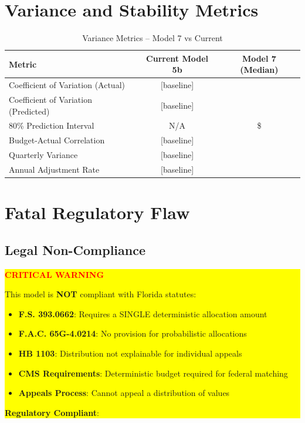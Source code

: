 \section{Variance and Stability Metrics}

\begin{table}[h]
\centering
\caption{Variance Metrics -- Model 7 vs Current}
\begin{tabular}{lcc}
\toprule
\textbf{Metric} & \textbf{Current Model 5b} & \textbf{Model 7 (Median)} \\
\midrule
Coefficient of Variation (Actual) & [baseline] & \ModelSevenCVActual{} \\
Coefficient of Variation (Predicted) & [baseline] & \ModelSevenCVPredicted{} \\
80\% Prediction Interval & N/A & \$\ModelSevenPredictionInterval{} \\
Budget-Actual Correlation & [baseline] & \ModelSevenBudgetActualCorr{} \\
Quarterly Variance & [baseline] & \ModelSevenQuarterlyVariance{} \\
Annual Adjustment Rate & [baseline] & \ModelSevenAnnualAdjustmentRate{} \\
\bottomrule
\end{tabular}
\end{table}

\section{Fatal Regulatory Flaw}

\subsection{Legal Non-Compliance}

\begin{center}
\colorbox{yellow}{
\begin{minipage}{0.9\textwidth}
\textbf{\textcolor{red}{ CRITICAL WARNING }}

This model is \textbf{NOT} compliant with Florida statutes:

\begin{itemize}
    \item \textbf{F.S. 393.0662}: Requires a SINGLE deterministic allocation amount
    \item \textbf{F.A.C. 65G-4.0214}: No provision for probabilistic allocations
    \item \textbf{HB 1103}: Distribution not explainable for individual appeals
    \item \textbf{CMS Requirements}: Deterministic budget required for federal matching
    \item \textbf{Appeals Process}: Cannot appeal a distribution of values
\end{itemize}

\textbf{Regulatory Compliant}: \ModelSevenRegulatoryCompliant{}
\end{minipage}
}
\end{center}

